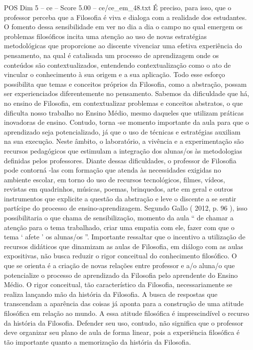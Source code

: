 \begin{textsample}{POS Dim 5 – ce – Score 5.00 – ce/ce\_em\_48.txt}
É preciso, para isso, que o professor perceba que a Filosofia é viva e dialoga com a realidade dos estudantes.
O fomento dessa sensibilidade em ver no dia a dia o campo no qual emergem os problemas filosóficos incita uma atenção ao uso de novas estratégias metodológicas que proporcione ao discente vivenciar uma efetiva experiência do pensamento, na qual é catalisada um processo de aprendizagem onde os conteúdos são contextualizados, entendendo contextualização como o ato de vincular o conhecimento à sua origem e a sua aplicação.
Todo esse esforço possibilita que temas e conceitos próprios da Filosofia, como a abstração, possam ser experienciados diferentemente no pensamento.
Sabemos da dificuldade que há, no ensino de Filosofia, em contextualizar problemas e conceitos abstratos, o que dificulta nosso trabalho no Ensino Médio, mesmo daqueles que utilizam práticas inovadoras de ensino.
Contudo, torna -se momento importante da aula para que o aprendizado seja potencializado, já que o uso de técnicas e estratégias auxiliam na sua execução.
Neste âmbito, o laboratório, a vivência e a experimentação são recursos pedagógicos que estimulam a integração dos alunas/os às metodologias definidas pelos professores.
Diante dessas dificuldades, o professor de Filosofia pode contorná -las com formação que atenda às necessidades exigidas no ambiente escolar, em torno do uso de recursos tecnológicos, filmes, vídeos, revistas em quadrinhos, músicas, poemas, brinquedos, arte em geral e outros instrumentos que explicite a questão da abstração e leve o discente a se sentir partícipe do processo de ensino-aprendizagem.
Segundo Gallo ( 2012, p. 96 ), isso possibilitaria o que chama de sensibilização, momento da aula “ de chamar a atenção para o tema trabalhado, criar uma empatia com ele, fazer com que o tema ‘ afete ’ os alunas/os ”.
Importante ressaltar que o incentivo a utilização de recursos didáticos que dinamizam as aulas de Filosofia, em diálogo com as aulas expositivas, não busca reduzir o rigor conceitual do conhecimento filosófico.
O que se orienta é a criação de novas relações entre professor e a/o aluna/o que potencialize o processo de aprendizado da Filosofia pelo aprendente do Ensino Médio.
O rigor conceitual, tão característico da Filosofia, necessariamente se realiza lançando mão da história da Filosofia.
A busca de respostas que transcendam a aparência das coisas já aponta para a construção de uma atitude filosófica em relação ao mundo.
A essa atitude filosófica é imprescindível o recurso da história da Filosofia.
Defender seu uso, contudo, não significa que o professor deve organizar seu plano de aula de forma linear, pois a experiência filosófica é tão importante quanto a memorização da história da Filosofia.

\end{textsample}
